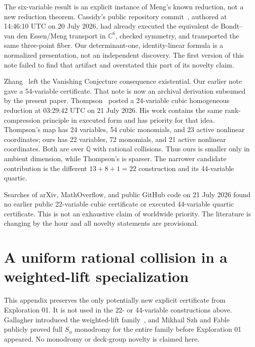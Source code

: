 \documentclass[11pt]{article}
\newcommand{\C}{\mathbb C}
\newcommand{\Q}{\mathbb Q}
\begin{document}
The six-variable result is an explicit instance of Meng's known reduction,
not a new reduction theorem. Cassidy's public repository
commit~\cite{cassidy}, authored at 14:46:10 UTC on 20 July 2026, had already
executed the equivalent de Bondt--van den Essen/Meng transport in $\C^6$,
checked symmetry, and transported the same three-point fiber. Our
determinant-one, identity-linear formula is a normalized presentation, not an
independent discovery. The first version of this note failed to find that
artifact and overstated this part of its novelty claim.

Zhang~\cite{zhang} left the Vanishing Conjecture consequence existential. Our
earlier note~\cite{kriebel54} gave a 54-variable certificate.
That note is now an archival derivation subsumed by the present paper.
Thompson~\cite{thompson} posted a 24-variable cubic homogeneous reduction at
03:29:42 UTC on 21 July 2026. His work contains the same rank-compression
principle in executed form and has priority for that idea. Thompson's map has
24 variables, 54 cubic monomials, and 23 active nonlinear coordinates; ours
has 22 variables, 72 monomials, and 21 active nonlinear coordinates. Both are
over $\Q$ with rational collisions. Thus ours is smaller only in ambient
dimension, while Thompson's is sparser. The narrower candidate contribution
is the different $13+8+1=22$ construction and its 44-variable quartic.

Searches of arXiv, MathOverflow, and public GitHub code on 21 July 2026 found
no earlier public 22-variable cubic certificate or executed 44-variable
quartic certificate. This is not an exhaustive claim of worldwide priority.
The literature is changing by the hour and all novelty statements are
provisional.

\appendix
\section{A uniform rational collision in a weighted-lift specialization}

This appendix preserves the only potentially new explicit certificate from
Exploration 01. It is not used in the 22- or 44-variable constructions above.
Gallagher introduced the weighted-lift family~\cite{gallagher}, and Mikhail
Szh and Fable~\cite{mikhail} publicly proved full $S_n$ monodromy for the
entire family before Exploration 01 appeared. No monodromy or deck-group
novelty is claimed here.
\end{document}
